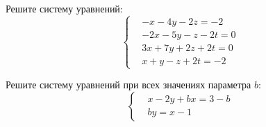 %
%



\begin{problems}

\item
Решите систему уравнений:
\[\left\{\begin{aligned}&
     -x -4y -2z     = -2
\\&
    -2x -5y  -z -2t =  0
\\&
     3x +7y +2z +2t =  0
\\&
      x  +y  -z +2t = -2
\end{aligned}\right.\]

\item
Решите систему уравнений при всех значениях параметра ${b}$:
\[\left\{\begin{aligned}&
    x - 2 y + {b} x = 3 - {b}
\\&
    {b} y = x - 1
\end{aligned}\right.\]

\end{problems}



